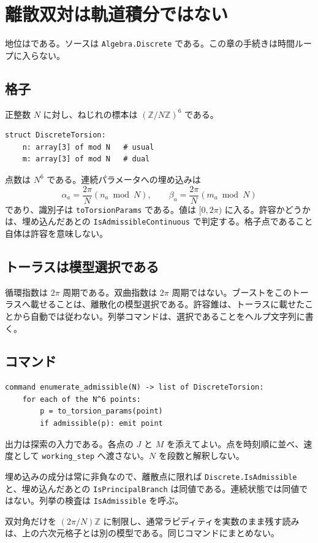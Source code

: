 \section{離散双対は軌道積分ではない}
\label{sec:discrete}

地位は\dstrec{}である。ソースは \texttt{Algebra.Discrete} である。この章の手続きは時間ループに入らない。

\subsection{格子}

正整数 \(N\) に対し、ねじれの標本は \((\mathbb{Z}/N\mathbb{Z})^6\) である。
\begin{verbatim}
struct DiscreteTorsion:
    n: array[3] of mod N   # usual
    m: array[3] of mod N   # dual
\end{verbatim}
点数は \(N^6\) である。連続パラメータへの埋め込みは
\[
\alpha_a=\frac{2\pi}{N}(n_a\bmod N),\qquad
\beta_a=\frac{2\pi}{N}(m_a\bmod N)
\]
であり、識別子は \texttt{toTorsionParams} である。値は \([0,2\pi)\) に入る。許容かどうかは、埋め込んだあとの \texttt{IsAdmissibleContinuous} で判定する。格子点であること自体は許容を意味しない。

\subsection{トーラスは模型選択である}

循環指数は \(2\pi\) 周期である。双曲指数は \(2\pi\) 周期ではない。ブーストをこのトーラスへ載せることは、離散化の模型選択である。許容錐は、トーラスに載せたことから自動では従わない。列挙コマンドは、選択であることをヘルプ文字列に書く。

\subsection{コマンド}

\begin{verbatim}
command enumerate_admissible(N) -> list of DiscreteTorsion:
    for each of the N^6 points:
        p = to_torsion_params(point)
        if admissible(p): emit point
\end{verbatim}

出力は探索の入力である。各点の \(J\) と \(M\) を添えてよい。点を時刻順に並べ、速度として \texttt{working\_step} へ渡さない。\(N\) を段数と解釈しない。

埋め込みの成分は常に非負なので、離散点に限れば \texttt{Discrete.IsAdmissible} と、埋め込んだあとの \texttt{IsPrincipalBranch} は同値である。連続状態では同値ではない。列挙の検査は \texttt{IsAdmissible} を呼ぶ。

双対角だけを \((2\pi/N)\mathbb{Z}\) に制限し、通常ラピディティを実数のまま残す読みは、上の六次元格子とは別の模型である。同じコマンドにまとめない。
